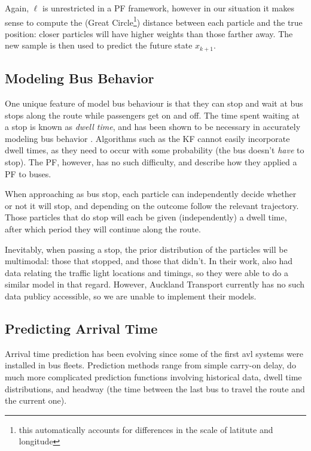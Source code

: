 \documentclass[12pt,a4paper]{article}
\begin{document}
Again, $\ell$ is unrestricted in a PF framework, however in our situation it makes sense to 
compute the (Great Circle\footnote{this automatically accounts for differences in the scale of latitute
and longitude}) 
distance between each particle and the true position:
closer particles will have higher weights than those farther away.
The new sample is then used to predict the future state $x_{k+1}$.





\subsection{Modeling Bus Behavior}
\label{sec:busbehavior}


One unique feature of model bus behaviour is that they can stop and wait at bus stops along the route
while passengers get on and off.
The time spent waiting at a stop is known as \emph{dwell time},
and has been shown to be necessary in accurately modeling bus behavior \citep{cn}.
Algorithms such as the KF cannot easily incorporate dwell times,
as they need to occur with some probability (the bus doesn't \emph{have} to stop).
The PF, however, has no such difficulty,
and \cite{hans-etal:2015} describe how they applied a PF to buses.


When approaching as bus stop,
each particle can independently decide whether or not it will stop,
and depending on the outcome follow the relevant trajectory.
Those particles that do stop will each be given (independently)
a dwell time, after which period they will continue along the route.

Inevitably, when passing a stop, the prior distribution of the particles will be multimodal:
those that stopped, and those that didn't.
In their work, \cite{hans-etal:2015} also had data relating the traffic light locations and
timings, so they were able to do a similar model in that regard.
However, Auckland Transport currently has no such data publicy accessible,
so we are unable to implement their models.



\subsection{Predicting Arrival Time}
\label{sec:arrivaltimeprediction}

Arrival time prediction has been evolving since some of the first \gls{avl}
systems were installed in bus fleets.
Prediction methods range from simple carry-on delay,
do much more complicated prediction functions involving historical data,
dwell time distributions, 
and headway (the time between the last bus to travel the route and the current one).
\end{document}
